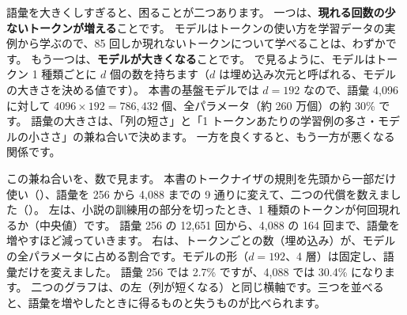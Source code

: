 語彙を大きくしすぎると、困ることが二つあります。
一つは、\textbf{現れる回数の少ないトークンが増える}ことです。
モデルはトークンの使い方を学習データの実例から学ぶので、85 回しか現れないトークンについて学べることは、わずかです。
もう一つは、\textbf{モデルが大きくなる}ことです。
で見るように、モデルはトークン 1 種類ごとに $d$ 個の数を持ちます（$d$ は埋め込み次元と呼ばれる、モデルの大きさを決める値です）。
本書の基盤モデルでは $d=192$ なので、語彙 4,096 に対して $4096\times192=786{,}432$ 個、全パラメータ（約 260 万個）の約 30\% です。
語彙の大きさは、「列の短さ」と「1 トークンあたりの学習例の多さ・モデルの小ささ」の兼ね合いで決めます。
一方を良くすると、もう一方が悪くなる関係です。

この兼ね合いを、数で見ます。
本書のトークナイザの規則を先頭から一部だけ使い（）、語彙を 256 から 4,088 までの 9 通りに変えて、二つの代償を数えました（）。
左は、小説の訓練用の部分を切ったとき、1 種類のトークンが何回現れるか（中央値）です。
語彙 256 の 12,651 回から、4,088 の 164 回まで、語彙を増やすほど減っていきます。
右は、トークンごとの数（埋め込み）が、モデルの全パラメータに占める割合です。モデルの形（$d=192$、4 層）は固定し、語彙だけを変えました。
語彙 256 では 2.7\% ですが、4,088 では 30.4\% になります。
二つのグラフは、の左（列が短くなる）と同じ横軸です。三つを並べると、語彙を増やしたときに得るものと失うものが比べられます。

